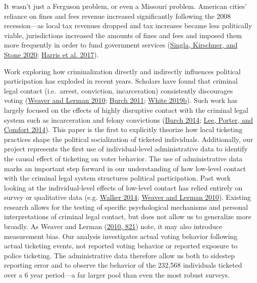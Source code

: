 \documentclass[
  12pt,
]{article}
\begin{document}
It wasn't just a Ferguson problem, or even a Missouri problem. American cities' reliance on fines and fees revenue increased significantly following the 2008 recession---as local tax revenues dropped and tax increases became less politically viable, jurisdictions increased the amounts of fines and fees and imposed them more frequently in order to fund government services (\protect\hyperlink{ref-Singla2020}{Singla, Kirschner, and Stone 2020}; \protect\hyperlink{ref-Harris2017}{Harris et al. 2017}).

Work exploring how criminalization directly and indirectly influences political participation has exploded in recent years. Scholars have found that criminal legal contact (i.e.~arrest, conviction, incarceration) consistently discourages voting (\protect\hyperlink{ref-Weaver2010}{Weaver and Lerman 2010}; \protect\hyperlink{ref-Burch2011}{Burch 2011}; \protect\hyperlink{ref-White2019a}{White 2019b}). Such work has largely focused on the effects of highly disruptive contact with the criminal legal system such as incarceration and felony convictions (\protect\hyperlink{ref-Burch2014}{Burch 2014}; \protect\hyperlink{ref-Lee2014}{Lee, Porter, and Comfort 2014}). This paper is the first to explicitly theorize how local ticketing practices shape the political socialization of ticketed individuals. Additionally, our project represents the first use of individual-level administrative data to identify the causal effect of ticketing on voter behavior.
The use of administrative data marks an important step forward in our understanding of how low-level contact with the criminal legal system structures political participation. Past work looking at the individual-level effects of low-level contact has relied entirely on survey or qualitative data (e.g. \protect\hyperlink{ref-Walker2014}{Walker 2014}; \protect\hyperlink{ref-Weaver2010}{Weaver and Lerman 2010}). Existing research allows for the testing of specific psychological mechanisms and personal interpretations of criminal legal contact, but does not allow us to generalize more broadly. As Weaver and Lerman (\protect\hyperlink{ref-Weaver2010}{2010, 821}) note, it may also introduce measurement bias. Our analysis investigates actual voting behavior following actual ticketing events, not reported voting behavior or reported exposure to police ticketing. The administrative data therefore allow us both to sidestep reporting error and to observe the behavior of the 232,568 individuals ticketed over a 6 year period---a far larger pool than even the most robust surveys.
\end{document}
